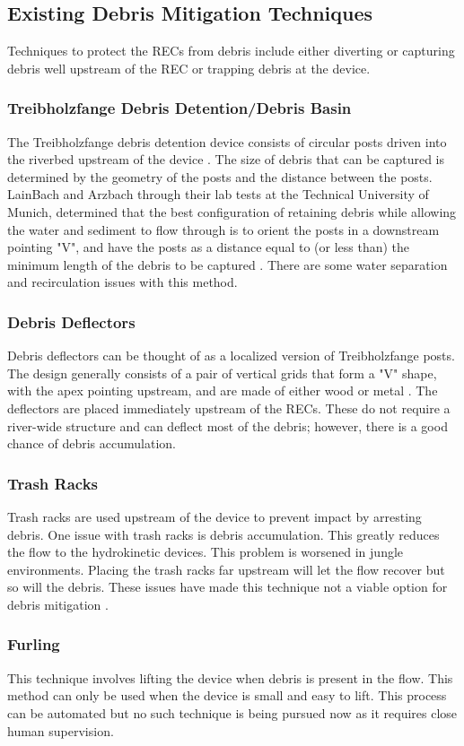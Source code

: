\subsection{Existing Debris Mitigation Techniques}
Techniques to protect the RECs from debris include either diverting or capturing debris well upstream of the REC or trapping debris at the device.
\subsubsection{Treibholzfange Debris Detention/Debris Basin}
The Treibholzfange debris detention device consists of circular posts driven into the riverbed upstream of the device \cite{Reference1}. The size of debris that can be captured is determined by the geometry of the posts and the distance between the posts. LainBach and Arzbach through their lab tests at the Technical University of Munich, determined that the best configuration of retaining debris while allowing the water and sediment to flow through is to orient the posts in a downstream pointing "V", and have the posts as a distance equal to (or less than) the minimum length of the debris to be captured \cite{Reference4}. There are some water separation and recirculation issues with this method. 
\subsubsection{Debris Deflectors}
Debris deflectors can be thought of as a localized version of Treibholzfange posts. The design generally consists of a pair of vertical grids that form a "V" shape, with the apex pointing upstream, and are made of either wood or metal \cite{Reference1}. The deflectors are placed immediately upstream of the RECs. These do not require a river-wide structure and can deflect most of the debris; however, there is a good chance of debris accumulation. 
\subsubsection{Trash Racks}
Trash racks are used upstream of the device to prevent impact by arresting debris. One issue with trash racks is debris accumulation. This greatly reduces the flow to the hydrokinetic devices. This problem is worsened in jungle environments. Placing the trash racks far upstream will let the flow recover but so will the debris. These issues have made this technique not a viable option for debris mitigation \cite{Reference1}. 
\subsubsection{Furling}
This technique involves lifting the device when debris is present in the flow. This method can only be used when the device is small and easy to lift. This process can be automated but no such technique is being pursued now as it requires close human supervision.
